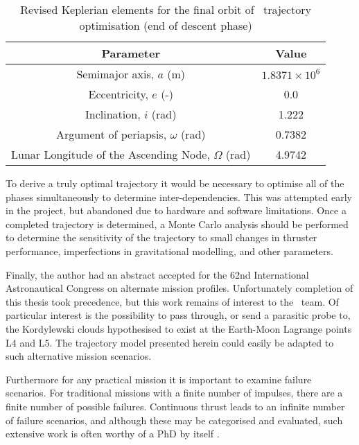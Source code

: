 \begin{table}[ht]
\caption{Revised Keplerian elements for the final orbit of \BW\ trajectory optimisation (end of descent phase)}
\label{tab:Phase-5-constraints-revised}
\begin{center}
\begin{tabular} {cc}\toprule
Parameter & Value\\\midrule
Semimajor axis, $a$ (m) & $1.8371\times 10^6$\\
Eccentricity, $e$ (-) & 0.0\\
Inclination, $i$ (rad) & 1.222\\
Argument of periapsis, $\omega$ (rad) & 0.7382 \\
Lunar Longitude of the Ascending Node, $\Omega$ (rad) & 4.9742 \\\bottomrule
\end{tabular}
\end{center}
\end{table}

To derive a truly optimal trajectory it would be necessary to optimise all of the phases simultaneously to determine inter-dependencies. This was attempted early in the project, but abandoned due to hardware and software limitations. Once a completed trajectory is determined, a Monte Carlo analysis should be performed to determine the sensitivity of the trajectory to small changes in thruster performance, imperfections in gravitational modelling, and other parameters.

Finally, the author had an abstract accepted for the 62nd International Astronautical Congress on alternate mission profiles. Unfortunately completion of this thesis took precedence, but this work remains of interest to the \BW\ team. Of particular interest is the possibility to pass through, or send a parasitic probe to, the Kordylewski clouds hypothesised to exist at the Earth-Moon Lagrange points L4 and L5. The trajectory model presented herein could easily be adapted to such alternative mission scenarios.

Furthermore for any practical mission it is important to examine failure scenarios. For traditional  missions with a finite number of impulses, there are a finite number of possible failures. Continuous thrust leads to an infinite number of failure scenarios, and although these may be categorised and evaluated, such extensive work is often worthy of a PhD by itself \parencite{Renk_thesis}.


